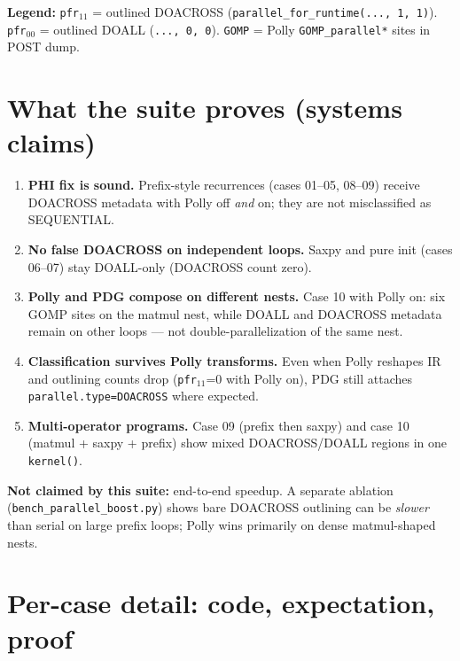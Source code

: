 \documentclass[11pt,a4paper]{article}
\begin{document}
\noindent
\textbf{Legend:} \texttt{pfr$_{11}$} = outlined DOACROSS
(\texttt{parallel\_for\_runtime(..., 1, 1)}).
\texttt{pfr$_{00}$} = outlined DOALL (\texttt{..., 0, 0}).
\texttt{GOMP} = Polly \texttt{GOMP\_parallel*} sites in POST dump.

\section{What the suite proves (systems claims)}

\begin{enumerate}
  \item \textbf{PHI fix is sound.} Prefix-style recurrences (cases 01--05, 08--09)
        receive DOACROSS metadata with Polly off \emph{and} on; they are not
        misclassified as SEQUENTIAL.

  \item \textbf{No false DOACROSS on independent loops.} Saxpy and pure init
        (cases 06--07) stay DOALL-only (DOACROSS count zero).

  \item \textbf{Polly and PDG compose on different nests.} Case 10 with Polly on:
        six GOMP sites on the matmul nest, while DOALL and DOACROSS metadata
        remain on other loops --- not double-parallelization of the same nest.

  \item \textbf{Classification survives Polly transforms.} Even when Polly
        reshapes IR and outlining counts drop (\texttt{pfr$_{11}$}=0 with Polly on),
        PDG still attaches \texttt{parallel.type=DOACROSS} where expected.

  \item \textbf{Multi-operator programs.} Case 09 (prefix then saxpy) and case 10
        (matmul + saxpy + prefix) show mixed DOACROSS/DOALL regions in one
        \texttt{kernel()}.
\end{enumerate}

\noindent
\textbf{Not claimed by this suite:} end-to-end speedup. A separate ablation
(\texttt{bench\_parallel\_boost.py}) shows bare DOACROSS outlining can be
\emph{slower} than serial on large prefix loops; Polly wins primarily on dense
matmul-shaped nests.

\section{Per-case detail: code, expectation, proof}
\end{document}
